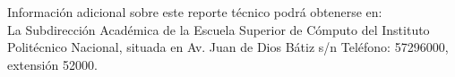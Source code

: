 \begin{titlepage}
\begin{center}
{{\begin{minipage}[c][10cm][c]{0.8\linewidth}
Información adicional sobre este reporte técnico podrá obtenerse en:\\

La Subdirección Académica de la Escuela Superior de Cómputo del Instituto Politécnico Nacional, situada en Av. Juan de Dios Bátiz s/n Teléfono: 57296000, extensión 52000.\\
	\end{minipage}
	}\hfill
}
\end{center}

\end{titlepage}